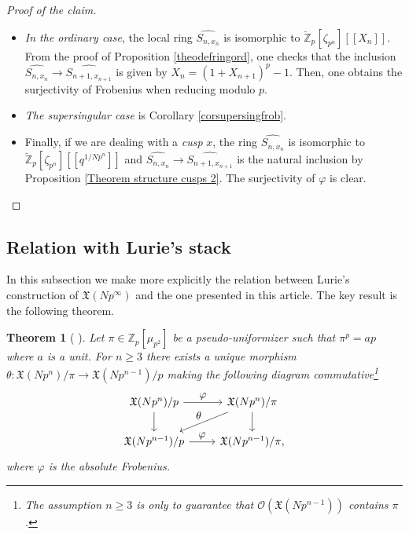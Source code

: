\documentclass[11pt]{article}
\let\ts\textstyle
\newcommand{\lcr}{[\![}
\newcommand{\rcr}{]\!]}
\numberwithin{equation}{section}
\newtheorem{theo}[prop]{Theorem}
\theoremstyle{definition}
\newcommand{\bb}[1]{\mathbb{#1}}
\newcommand{\f}[1]{\mathfrak{#1}}
\newcommand{\s}[1]{\mathscr{#1}}
\begin{document}
\begin{proof}[Proof of the claim]
\begin{itemize}

\item \textit{In the ordinary case}, the local ring $\widehat{S_{n,x_n}}$ is isomorphic to $ \breve{\bb{Z}}_p[\zeta_{p^n}]\lcr X_n\rcr$. From the proof of Proposition \ref{theodefringord}, one checks that the inclusion $\widehat{S_{n,x_n}}\to \widehat{S_{n+1,x_{n+1}}}$ is given by $X_{n}=(1+X_{n+1})^p-1$. Then, one obtains the surjectivity of Frobenius when reducing modulo $p$.

\item \textit{The supersingular case} is Corollary \ref{corsupersingfrob}.

\item Finally, if we are dealing with a \emph{cusp} $x$, the ring $\widehat{S_{n,x_n}}$ is isomorphic to $\breve{\bb{Z}}_p[\zeta_{p^{n}}]\lcr q^{1/Np^{n}}\rcr$ and $\widehat{S_{n,x_n}}\to \widehat{S_{n+1,x_{n+1}}}$ is the natural inclusion by Proposition \ref{Theorem structure cusps 2}. The surjectivity of $\varphi$ is clear.\qedhere
\end{itemize}
\end{proof}

\subsection*{Relation with Lurie's stack}

In this subsection we make more explicitly the relation between Lurie's construction of $\f{X}(Np^\infty)$ and the one presented in this article. The key result is the following theorem.

\begin{theo}[ {\cite[Th.\,1.9]{JacobFullLevel2019}}]
Let $\pi\in \bb{Z}_p[\mu_{p^2}]$ be a pseudo-uniformizer such that $\pi^p=ap$ where $a$ is a unit. For $n\geq 3$ there exists a unique morphism \hbox{$\theta: \f{X}(Np^n)/ \pi \to \f{X}(Np^{n-1})/p$} making the following diagram commutative\footnote{The assumption $n\geq 3$ is only to guarantee that $\s{O}(\f{X}(Np^{n-1}))$ contains $\pi$.}
\[
\begin{tikzcd}
\f{X}(Np^n)/p \ar[d] \ar[r, "\ts\varphi"] & \f{X}(Np^n)/\pi \ar[d] \ar[dl, "\ts\theta"'] \\
\f{X}(Np^{n-1})/p \ar[r, "\ts\varphi"] & \f{X}(Np^{n-1})/ \pi,
\end{tikzcd}
\]
where $\varphi$ is the absolute Frobenius.
\end{theo}
\end{document}
